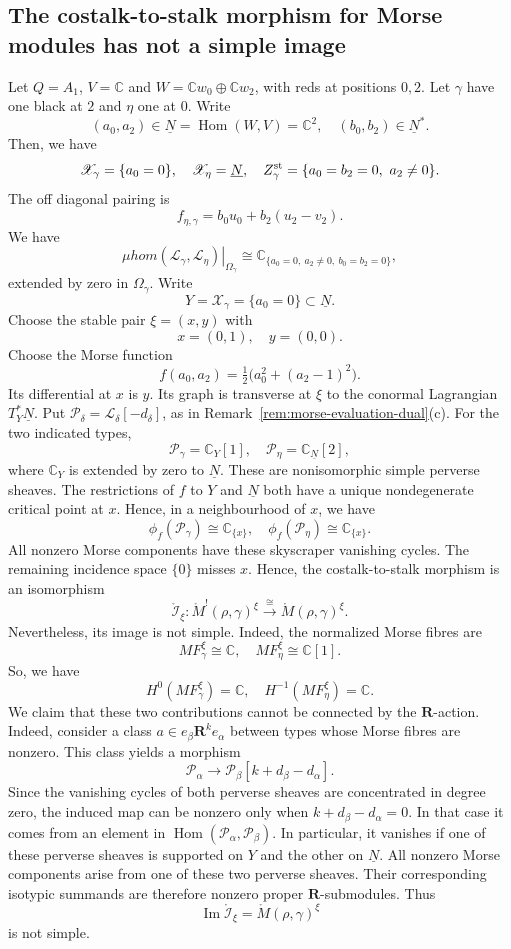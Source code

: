 \documentclass[11pt,reqno]{amsart}
\theoremstyle{definition}
\theoremstyle{remark}
\def\bbC{\mathbb C}
\def\dN{\underline N}
\def\scrX{\mathscr X}
\def\Hom{\operatorname{Hom}}
\def\muhom{\mu hom}
\def\bR{\mathbf R}
\begin{document}
\subsection{The costalk-to-stalk morphism for Morse modules has not a simple image}
\label{ex:coMorse-A1-nonsimple}
Let $Q=A_1$, $V=\bbC$ and
$W=\bbC w_0\oplus\bbC w_2$, with reds at positions $0,2$.
Let $\gamma$ have one black at $2$ and $\eta$ one at $0$.
Write 
$$(a_0,a_2)\in\dN=\Hom(W,V)=\bbC^2
,\quad
(b_0,b_2)\in\dN^*.$$ 
Then, we have
\[
 \scrX_\gamma=\{a_0=0\},\quad \scrX_\eta=\dN,\quad
 Z_\gamma^{\rm st}=\{a_0=b_2=0,\ a_2\ne0\}.
\]
The off diagonal pairing is
$$f_{\eta,\gamma}=b_0u_0+b_2(u_2-v_2).$$
We have
\begin{equation}\label{eq:offdiag-A1}
 \left.\muhom(\mathscr L_\gamma,\mathscr L_\eta)\right|_{\Omega_\gamma}
 \cong\bbC_{\{a_0=0,\ a_2\ne0,\ b_0=b_2=0\}},
\end{equation}
extended by zero in $\Omega_\gamma$.
Write 
$$Y=\scrX_\gamma=\{a_0=0\}\subset\dN.$$
Choose the stable pair $\xi=(x,y)$ with
\[
 x=(0,1),\quad y=(0,0).
\]
Choose the Morse  function
\[
 f(a_0,a_2)=\tfrac12\bigl(a_0^2+(a_2-1)^2\bigr).
\]
Its differential at $x$ is $y$.
Its graph is transverse at
$\xi$ to the conormal Lagrangian $T_Y^*\dN$.
Put $\mathcal P_\delta=\mathscr L_\delta[-d_\delta]$, as in Remark~\ref{rem:morse-evaluation-dual}(c). For the two indicated
types,
\[
 \mathcal P_\gamma=\bbC_Y[1],\quad
 \mathcal P_\eta=\bbC_{\dN}[2],
\]
where $\bbC_Y$ is extended by zero to $\dN$.
These are nonisomorphic simple perverse sheaves. The restrictions
of $f$ to $Y$ and $\dN$ both have a unique nondegenerate critical
point at $x$. Hence, in a neighbourhood of $x$, we have
\[
 \phi_f(\mathcal P_\gamma)\cong\bbC_{\{x\}},\quad
 \phi_f(\mathcal P_\eta)\cong\bbC_{\{x\}}.
\]
All nonzero Morse components have these skyscraper vanishing cycles.
The remaining incidence space $\{0\}$ misses $x$.
Hence, the costalk-to-stalk morphism is an isomorphism
\[
 \mathring{\mathcal I}_\xi:\mathring M^!(\rho,\gamma)^\xi
 \xrightarrow{\cong}\mathring M(\rho,\gamma)^\xi.
\]
Nevertheless, its image is not simple. Indeed, the normalized
Morse fibres are
\[
 MF^\xi_\gamma\cong\bbC,\quad MF^\xi_\eta\cong\bbC[1].
\]
So, we have
$$H^0(MF^\xi_\gamma)=\bbC
,\quad
H^{-1}(MF^\xi_\eta)=\bbC.$$
We claim that these two contributions cannot be connected by the $\bR$-action.
Indeed, consider a class
$a\in e_\beta\bR^k e_\alpha$ between types whose Morse fibres
are nonzero. This class yields a morphism
\[
 \mathcal P_\alpha\longrightarrow
 \mathcal P_\beta[k+d_\beta-d_\alpha].
\]
Since the vanishing cycles of both perverse sheaves are
concentrated in degree zero, the induced map can be nonzero only
when $k+d_\beta-d_\alpha=0$. In that case it comes from an element in
$\operatorname{Hom}(\mathcal P_\alpha,\mathcal P_\beta)$.
In particular, it vanishes if one of these perverse sheaves is supported on
$Y$ and the other on $\dN$. All nonzero Morse components arise
from one of these two perverse sheaves. Their corresponding
isotypic summands are therefore nonzero proper $\bR$-submodules.
Thus
\[
 \operatorname{Im}\mathring{\mathcal I}_\xi
 =\mathring M(\rho,\gamma)^\xi
\]
is not simple.
\end{document}
